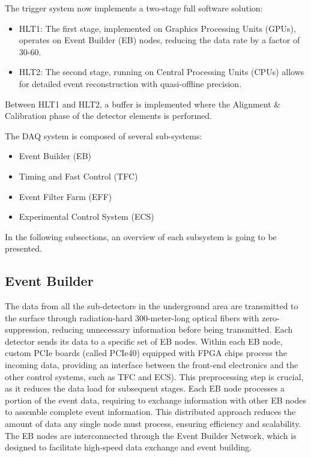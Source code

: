 The trigger system now implements a two-stage full software solution:
\begin{itemize}
\item HLT1: The first stage, implemented on Graphics Processing Units (GPUs), operates on Event Builder (EB) nodes, reducing the data rate by a factor of 30-60.
\item HLT2: The second stage, running on Central Processing Units (CPUs) allows for detailed event reconstruction with quasi-offline precision\cite{Gazzoni:2670650}.
\end{itemize}
Between HLT1 and HLT2, a buffer is implemented where the Alignment \& Calibration phase of the detector elements is performed.

The DAQ system\cite{CERN-LHCC-2014-016} is composed of several sub-systems:
\begin{itemize}
\item Event Builder (EB)
\item Timing and Fast Control (TFC)
\item Event Filter Farm (EFF)
\item Experimental Control System (ECS)
\end{itemize}
In the following subsections, an overview of each subsystem is going to be presented. 

\subsection{Event Builder}
The data from all the sub-detectors in the underground area are transmitted to the surface through radiation-hard 300-meter-long optical fibers with zero-suppression, reducing unnecessary information before being transmitted. Each detector sends its data to a specific set of EB nodes. Within each EB node, custom PCIe boards (called PCIe40) equipped with FPGA chips process the incoming data, providing an interface between the front-end electronics and the other control systems, such as TFC and ECS). This preprocessing step is crucial, as it reduces the data load for subsequent stages. Each EB node processes a portion of the event data, requiring to exchange information with other EB nodes to assemble complete event information. This distributed approach reduces the amount of data any single node must process, ensuring efficiency and scalability. The EB nodes are interconnected through the Event Builder Network, which is designed to facilitate high-speed data exchange and event building.




